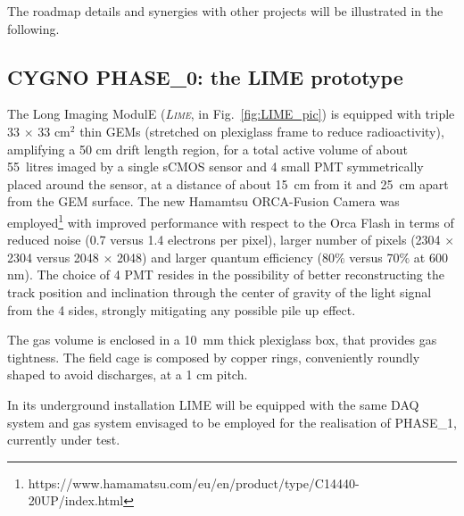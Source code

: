 \documentclass[physics,article,submit,moreauthors,pdftex]{Definitions/mdpi}
\newcommand{\lime}{{\textsc{Lime}}\xspace}
\begin{document}

The roadmap details and synergies with other projects will be illustrated in the following. 

\subsection{CYGNO PHASE\_0: the LIME prototype}\label{sec:phase0}

The Long Imaging ModulE ({\it \lime}, in Fig.~\ref{fig:LIME_pic}) is equipped with triple 33 $\times$ 33 cm$^2$ thin GEMs (stretched on plexiglass frame to reduce radioactivity), amplifying a 50 cm drift length region, for a total active volume of about 55~litres imaged by a single sCMOS sensor and 4 small PMT symmetrically placed around the sensor, at a distance of about 15~cm from it and 25~cm apart from the GEM surface. The new Hamamtsu ORCA-Fusion Camera was employed\footnote{https://www.hamamatsu.com/eu/en/product/type/C14440-20UP/index.html} with improved performance with respect to the Orca Flash in terms of reduced noise (0.7 versus 1.4 electrons per pixel), larger number of pixels (2304 $\times$ 2304 versus 2048 $\times$ 2048) and larger quantum efficiency (80$\%$ versus 70$\%$ at 600 nm). 
The choice of 4 PMT resides in the possibility of better reconstructing the track position and  inclination through the center of gravity of the light signal from the 4 sides, strongly mitigating any possible pile up effect.

The gas volume is enclosed in a 10~mm thick plexiglass box, that provides gas tightness. The field cage is composed by copper rings, conveniently roundly shaped to avoid discharges, at a 1 cm pitch.

In its underground installation LIME will be equipped with the same DAQ system and gas system envisaged to be employed for the realisation of PHASE\_1, currently under test.
\end{document}
